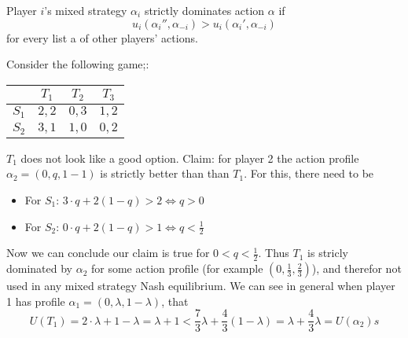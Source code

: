 \begin{definition}
      Player $i$'s mixed strategy $\alpha_{i}$ strictly dominates action $\alpha$ if
      \[
            u_{i}(\alpha_{i}'', \alpha_{-i}) > u_{i}(\alpha_{i}', \alpha_{-i})
      \]
      for every list a of other players' actions.
\end{definition}


\begin{example}
      Consider the following game;:
      \begin{table}[h!]
            \begin{center}
                  \begin{tabular}{ c | c c c}
                              & $T_1$ & $T_2$ & $T_3$ \\ \hline
                        $S_1$ & $2,2$ & $0,3$ & $1,2$ \\
                        $S_2$ & $3,1$ & $1,0$ & $0,2$
                  \end{tabular}
            \end{center}
      \end{table}
      $T_1$ does not look like a good option. Claim: for player 2 the action profile $\alpha_2 = (0,q,1-1)$ is strictly better than than $T_1$. For this, there need to be
      \begin{itemize}
            \item For $S_1$: $3 \cdot q + 2(1-q) > 2 \iff q >0$
            \item For $S_2$: $0 \cdot q + 2(1-q) > 1 \iff q < \frac{1}{2}$
      \end{itemize}
      Now we can conclude our claim is true for $0 < q <
            \frac{1}{2}$. Thus $T_1$ is stricly dominated by $\alpha_2$ for some action profile (for example $(0,\frac{1}{3}, \frac{2}{3})$), and therefor not used in any mixed strategy Nash equilibrium.
      We can see in general when player 1 has profile $\alpha_1 = (0,\lambda, 1-\lambda)$, that
      \[
            U(T_1) = 2\cdot \lambda + 1 - \lambda = \lambda + 1 < \frac{7}{3}\lambda + \frac{4}{3}(1-\lambda) = \lambda + \frac{4}{3}\lambda = U(\alpha_2)s
      \]
\end{example}


